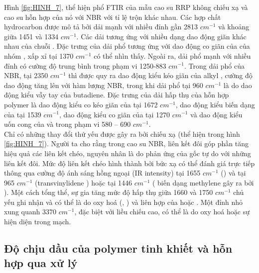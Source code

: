 \documentclass[12pt,a4paper]{article}
\begin{document}
	
	Hình \ref{fig:HINH_7}, thể hiện phổ FTIR của mẫu cao su RRP không chiếu xạ và cao su hỗn hợp của nó với NBR với tỉ lệ trộn khác nhau. Các hợp chất hydrocarbon được mô tả bởi dải mạnh với nhiều đỉnh gần 2813 $cm^{-1}$ và khoảng giữa 1451 và 1334 $cm^{-1}$. Các dải tương ứng với nhiều dạng dao động giãn khác nhau của chuỗi . Đặc trưng của dải phổ tương ứng với dao động co giãn của  của nhóm , xấp xỉ tại 1370 $cm^{-1}$ có thể nhìn thấy. Ngoài ra, dải phổ mạnh với nhiều đỉnh có cường độ trung bình trong phạm vi 1250-883 $cm^{-1}$. Trong dải phổ của NBR, tại 2350 $cm^{-1}$ thì được quy ra dao động kiểu kéo giãn của alkyl , cường độ dao động tăng lên với hàm lượng NBR, trong khi dải phổ tại 960 $cm^{-1}$ là do dao động kiểu vẫy tay của butadiene. Đặc trưng của dải hấp thụ của hỗn hợp polymer là dao động kiểu co kéo giãn của  tại 1672 $cm^{-1}$, dao động kiểu biến dạng của  tại 1539 $cm^{-1}$, dao động kiểu co giãn của  tại 1270 $cm^{-1}$ và dao động kiểu uốn cong của  và  trong phạm vi 580 – 690 $cm^{-1}$.\\
	
	
	Chỉ có những thay đổi thứ yếu được gây ra bởi chiếu xạ (thể hiện trong hình \ref{fig:HINH_7}). Người ta cho rằng trong cao su NBR, liên kết đôi góp phần tăng hiệu quả các liên kết chéo, nguyên nhân là do phản ứng của gốc tự do với những liên kết đôi. Mức độ liên kết chéo hình thành bởi bức xạ có thể đánh giá trực tiếp thông qua cường độ ánh sáng hồng ngoại (IR intensity) tại 1655 $cm^{-1}$ () và tại 965 $cm^{-1}$ (transvinylidene ) hoặc tại 1446 $cm^{-1}$ ( biến dạng methylene gây ra bởi ). Một cách tổng thể, sự gia tăng mức độ hấp thụ giữa 1660 và 1750 $cm^{-1}$ chủ yếu ghi nhận và có thể là do oxy hoá (,  ) và liên hợp của  hoặc . Một đỉnh nhỏ xung quanh 3370 $cm^{-1}$, đặc biệt với liều chiếu cao, có thể là do oxy hoá hoặc sự hiện diện  trong mạch.\\

	\subsection{Độ chịu dầu của polymer tinh khiết và hỗn hợp qua xử lý}
	
\end{document}
